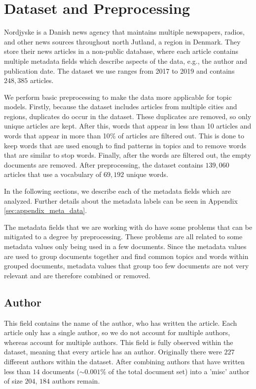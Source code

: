 \section{Dataset and Preprocessing}\label{sec:dataset}
Nordjyske is a Danish news agency that maintains multiple newspapers, radios, and other news sources throughout north Jutland, a region in Denmark.
They store their news articles in a non-public database, where each article contains multiple metadata fields which describe aspects of the data, e.g., the author and publication date.
The dataset we use ranges from 2017 to 2019 and contains $248,385$ articles.

We perform basic preprocessing to make the data more applicable for topic models.
Firstly, because the dataset includes articles from multiple cities and regions, duplicates do occur in the dataset.
These duplicates are removed, so only unique articles are kept.
After this, words that appear in less than 10 articles and words that appear in more than 10$\%$ of articles are filtered out.
This is done to keep words that are used enough to find patterns in topics and to remove words that are similar to stop words.
Finally, after the words are filtered out, the empty documents are removed.
After preprocessing, the dataset contains $139,060$ articles that use a vocabulary of $69,192$ unique words.

In the following sections, we describe each of the metadata fields which are analyzed.
Further details about the metadata labels can be seen in Appendix \autoref{sec:appendix_meta_data}.

The metadata fields that we are working with do have some problems that can be mitigated to a degree by preprocessing.
These problems are all related to some metadata values only being used in a few documents.
Since the metadata values are used to group documents together and find common topics and words within grouped documents, metadata values that group too few documents are not very relevant and are therefore combined or removed.

\subsection{Author}
This field contains the name of the author, who has written the article.
Each article only has a single author, so we do not account for multiple authors, whereas \citet{author_topic_2012} account for multiple authors.
This field is fully observed within the dataset, meaning that every article has an author.
Originally there were $227$ different authors within the dataset.
After combining authors that have written less than $14$ documents (${\sim}0.001\%$ of the total document set) into a 'misc' author of size $204$, $184$ authors remain.

